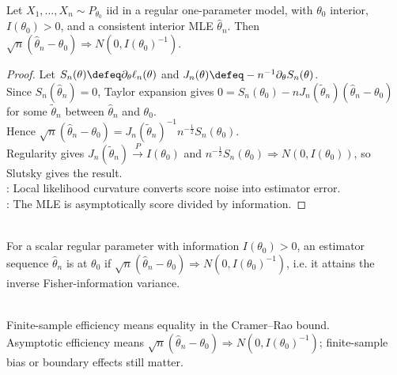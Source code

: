 \begin{theorem} \label{thm:mle-asymptotic-normality} \\
Let $X_1,\ldots,X_n\sim P_{\theta_0}$ iid in a regular one-parameter model, with $\theta_0$ interior, $I(\theta_0)>0$, and a consistent interior MLE $\widehat{\theta}_n$. Then $\sqrt{n}(\widehat{\theta}_n-\theta_0)\Rightarrow N(0,I(\theta_0)^{-1})$.
\begin{proof}
Let $S_n(\theta)\defeq\partial_\theta\ell_n(\theta)$ and $J_n(\theta)\defeq-n^{-1}\partial_\theta S_n(\theta)$.\\
Since $S_n(\widehat{\theta}_n)=0$, Taylor expansion gives $0=S_n(\theta_0)-nJ_n(\widetilde{\theta}_n)(\widehat{\theta}_n-\theta_0)$ for some $\widetilde{\theta}_n$ between $\widehat{\theta}_n$ and $\theta_0$.\\
Hence $\sqrt{n}(\widehat{\theta}_n-\theta_0)=J_n(\widetilde{\theta}_n)^{-1}n^{-\frac{1}{2}}S_n(\theta_0)$.\\
Regularity gives $J_n(\widetilde{\theta}_n)\xrightarrow{P}I(\theta_0)$ and $n^{-\frac{1}{2}}S_n(\theta_0)\Rightarrow N(0,I(\theta_0))$, so Slutsky gives the result.\\
: Local likelihood curvature converts score noise into estimator error.\\
: The MLE is asymptotically score divided by information.
\end{proof}
\end{theorem}

\begin{definition} \label{def:asymptotic-efficiency} \\
For a scalar regular parameter with information $I(\theta_0)>0$, an estimator sequence $\widehat{\theta}_n$ is  at $\theta_0$ if $\sqrt{n}(\widehat{\theta}_n-\theta_0)\Rightarrow N(0,I(\theta_0)^{-1})$, i.e. it attains the inverse Fisher-information variance.
\end{definition}

\begin{remark} \label{rem:asymptotic-efficiency-versus-finite-sample-efficiency} \\
Finite-sample efficiency means equality in the Cramer--Rao bound.\\
Asymptotic efficiency means $\sqrt{n}(\widehat{\theta}_n-\theta_0)\Rightarrow N(0,I(\theta_0)^{-1})$; finite-sample bias or boundary effects still matter.
\end{remark}
